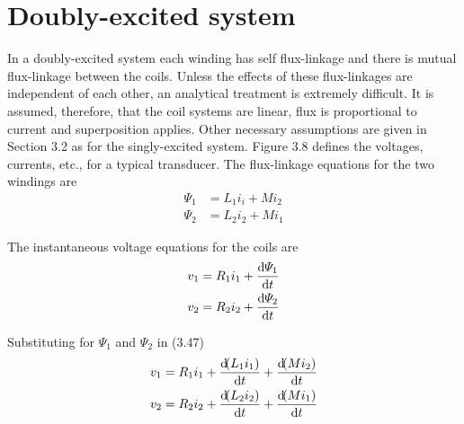 \documentclass[a4paper,numbers=noenddot,12pt]{scrbook}
\begin{document}
\section{Doubly-excited system} 
In a doubly-excited system each winding has self flux-linkage and there is mutual flux-linkage between the coils. Unless the effects of these flux-linkages are independent of each other, an analytical treatment is extremely difficult. It is assumed, therefore, that the coil systems are linear, flux is proportional to current and superposition applies. Other necessary assumptions are given in Section 3.2 as for the singly-excited system. 
Figure 3.8 defines the voltages, currents, etc., for a typical transducer. The flux-linkage equations for the two windings are
\begin{equation}
    \begin{aligned}
        \varPsi_1 & = L_1 i_i + M i_2 \\
        \varPsi_2 & = L_2 i_2 + M i_1
    \end{aligned}
    \label{eq:Eq3.46}
\end{equation}

The instantaneous voltage equations for the coils are
\begin{equation}
    \begin{aligned}
        v_1 & = R_1 i_1 + \dfrac{\dif \varPsi_1}{\dif t} \\
        v_2 & = R_2 i_2 + \dfrac{\dif \varPsi_2}{\dif t}
    \end{aligned}
    \label{eq:Eq3.47}
\end{equation}

Substituting for $\varPsi_1$ and $\varPsi_2$ in (3.47)
\begin{equation}
    \begin{aligned}
        v_1 & = R_1 i_1 + \dfrac{\dif (L_1 i_1)}{\dif t} + \dfrac{\dif(M i_2)}{\dif t} \\
        v_2 & = R_2 i_2 + \dfrac{\dif (L_2 i_2)}{\dif t} + \dfrac{\dif(M i_1)}{\dif t} 
    \end{aligned}
    \label{eq:Eq3.48}
\end{equation}
\end{document}
